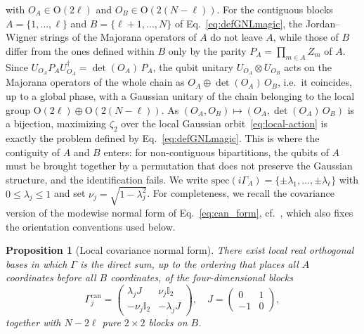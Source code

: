 \documentclass[prx,twocolumn,superscriptaddress,aps,10pt, frontmatterverbose, reprint,footinbib,longbibliography=true]{revtex4-2}
\newtheorem{proposition}{Proposition}
\providecommand{\DIFaddtex}[1]{{\protect\color{red}#1}} %
\providecommand{\DIFaddbegin}{\protect\color{red}} %
\providecommand{\DIFaddend}{\protect\color{black}} %
\providecommand{\DIFaddtex}[1]{\texorpdfstring{\DIFaddtex{#1}}{#1}} %
\providecommand{\DIFadd}[1]{\texorpdfstring{\DIFaddtex{#1}}{#1}} %
\newcommand{\DIFaddincludegraphics}[2][]{{\color{blue}\fbox{\DIFOincludegraphics[#1]{#2}}}} %
\DeclareRobustCommand{\DIFaddbegin}{\DIFOaddbegin \let\includegraphics\DIFaddincludegraphics} %
\DeclareRobustCommand{\DIFaddend}{\DIFOaddend \let\includegraphics\DIFOincludegraphics} %
\begin{document}
with $O_A\in\mathrm{O}(2\ell)$ and $O_B\in\mathrm{O}(2(N-\ell))$\DIFaddbegin \DIFadd{. For the contiguous blocks $A=\{1,\dots,\ell\}$ and $B=\{\ell+1,\dots,N\}$ of Eq.~\eqref{eq:defGNLmagic}, the Jordan--Wigner strings of the Majorana operators of $A$ do not leave $A$, while those of $B$ differ from the ones defined within $B$ only by the parity $P_A=\prod_{m\in A}Z_m$ of $A$. Since $U_{O_A}P_AU_{O_A}^\dagger=\det(O_A)\,P_A$, the qubit unitary $U_{O_A}\otimes U_{O_B}$ acts on the Majorana operators of the whole chain as $O_A\oplus\det(O_A)\,O_B$, i.e.\ it coincides, up to a global phase, with a Gaussian unitary of the chain belonging to the local group $\mathrm{O}(2\ell)\oplus\mathrm{O}(2(N-\ell))$. As $(O_A,O_B)\mapsto(O_A,\det(O_A)\,O_B)$ is a bijection, }\DIFaddend maximizing $\zeta_2$ over the local Gaussian orbit\DIFaddbegin \DIFadd{~\eqref{eq:local-action} }\DIFaddend is exactly the problem defined by Eq.~\eqref{eq:defGNLmagic}. \DIFaddbegin \DIFadd{This is where the contiguity of $A$ and $B$ enters: for non-contiguous bipartitions, the qubits of $A$ must be brought together by a permutation that does not preserve the Gaussian structure, and the identification fails.
 }\DIFaddend We write $\mathrm{spec}(i\Gamma_A)=\{\pm\lambda_1,\dots,\pm\lambda_\ell\}$ with $0\le\lambda_j\le 1$ and set $\nu_j=\sqrt{1-\lambda_j^2}$.
For completeness, we recall the covariance version of the modewise normal form of Eq.~\eqref{eq:can_form}, cf.~\cite{BoteroReznik2004}, which also fixes the orientation conventions used below. 

\begin{proposition}[Local covariance normal form]
\label{prop:covariance-normal-form}
There exist local real orthogonal bases in which $\Gamma$ is the direct sum, up to the ordering that places all $A$ coordinates before all $B$ coordinates, of the four-dimensional blocks
\begin{equation}
    \Gamma^{\mathrm{can}}_j=\begin{pmatrix}\lambda_jJ& \nu_j\mathbb{I}_2\\ -\nu_j\mathbb{I}_2&-\lambda_jJ\end{pmatrix},
    \quad J=\begin{pmatrix}0&1\\-1&0\end{pmatrix},
    \label{eq:canonical-covariance-block}
\end{equation}
together with $N-2\ell$ pure $2\times 2$ blocks on $B$.
\end{proposition}
\end{document}

